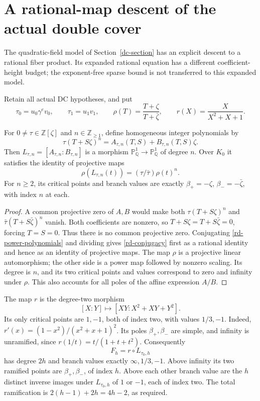 \section{A rational-map descent of the actual double cover}
\label{rd-section}

The quadratic-field model of Section~\ref{dc-section} has an explicit
descent to a rational fiber product. Its expanded rational equation
has a different coefficient-height budget; the exponent-free sparse
bound is not transferred to this expanded model.

Retain all actual DC hypotheses, and put
\[
 \tau_0=u_0\gamma^e v_0,\qquad \tau_1=u_1v_1,
 \qquad \rho(T)=\frac{T+\zeta}{T+\bar\zeta},
 \qquad r(X)=\frac{X}{X^2+X+1}.
\]

\begin{lemma}\label{rd-power-map}
For $0\ne\tau\in\mathbb Z[\zeta]$ and $n\in\mathbb Z_{\ge1}$, define homogeneous
integer polynomials by
\begin{equation}\label{rd-power-polynomials}
 \tau(T+S\zeta)^n=A_{\tau,n}(T,S)+B_{\tau,n}(T,S)\zeta.
\end{equation}
Then $L_{\tau,n}=[A_{\tau,n}:B_{\tau,n}]$ is a morphism
$\mathbb P^1_{\mathbb Q}\to\mathbb P^1_{\mathbb Q}$ of degree $n$.
Over $K_0$ it satisfies the identity of projective maps
\begin{equation}\label{rd-conjugacy}
 \rho(L_{\tau,n}(t))=(\tau/\bar\tau)\rho(t)^n.
\end{equation}
For $n\ge2$, its critical points and branch values are exactly
$\beta_+=-\zeta$, $\beta_-=-\bar\zeta$, with index $n$ at each.
\end{lemma}
\begin{proof}
A common projective zero of $A,B$ would make both
$\tau(T+S\zeta)^n$ and $\bar\tau(T+S\bar\zeta)^n$ vanish.
Both coefficients are nonzero, so $T+S\zeta=T+S\bar\zeta=0$,
forcing $T=S=0$. Thus there is no common projective zero.
Conjugating \eqref{rd-power-polynomials} and dividing gives
\eqref{rd-conjugacy} first as a rational identity and hence as an
identity of projective maps. The map $\rho$ is a projective linear
automorphism; the other side is a power map followed by nonzero
scaling. Its degree is $n$, and its two critical points and values
correspond to zero and infinity under $\rho$. This also accounts
for all poles of the affine expression $A/B$.
\end{proof}

The map $r$ is the degree-two morphism
\[
 [X:Y]\longmapsto[XY:X^2+XY+Y^2].
\]
Its only critical points are $1,-1$, both of index two, with
values $1/3,-1$. Indeed,
$r'(x)=(1-x^2)/(x^2+x+1)^2$. Its poles $\beta_+,\beta_-$ are
simple, and infinity is unramified, since
$r(1/t)=t/(1+t+t^2)$. Consequently
\begin{equation}\label{rd-composite}
 F_h=r\circ L_{\tau_0,h}
\end{equation}
has degree $2h$ and branch values exactly $\infty,1/3,-1$.
Above infinity its two ramified points are $\beta_+,\beta_-$,
of index $h$. Above each other branch value are the $h$ distinct
inverse images under $L_{\tau_0,h}$ of $1$ or $-1$, each of index
two. The total ramification is $2(h-1)+2h=4h-2$, as required.


